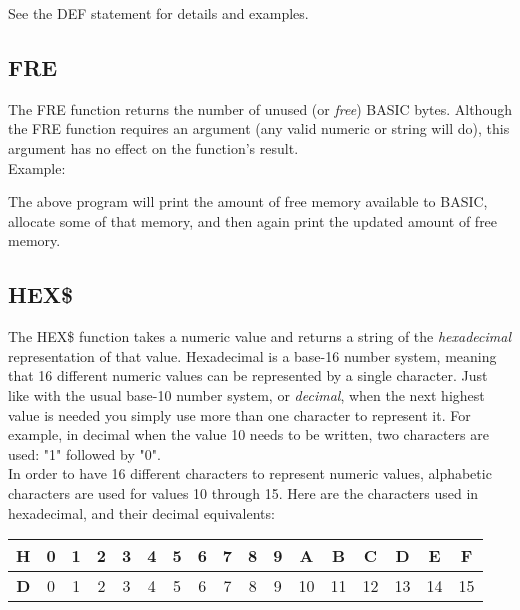 See the {\ttfamily DEF} statement for details and examples.\\

\subsection{FRE}

The {\ttfamily FRE} function returns the number of unused (or {\em free}) BASIC
bytes.  Although the {\ttfamily FRE} function requires an argument (any valid
numeric or string will do), this argument has no effect on the function's
result.\\

Example:\\


The above program will print the amount of free memory available to BASIC,
allocate some of that memory, and then again print the updated amount of free
memory.\\

\subsection{HEX\$}

The {\ttfamily HEX\$} function takes a numeric value and returns a string of
the {\em hexadecimal} representation of that value.  Hexadecimal is a base-16
number system, meaning that 16 different numeric values can be represented by a
single character.  Just like with the usual base-10 number system, or {\em
decimal}, when the next highest value is needed you simply use more than one
character to represent it.  For example, in decimal when the value 10 needs to
be written, two characters are used: "1" followed by "0".\\

In order to have 16 different characters to represent numeric values,
alphabetic characters are used for values 10 through 15.  Here are the
characters used in hexadecimal, and their decimal equivalents:\\

\begin{tabular}{|c|c|c|c|c|c|c|c|c|c|c|c|c|c|c|c|c|}
	\hline
	{\bfseries H} & 0 & 1 & 2 & 3 & 4 & 5 & 6 & 7 & 8 & 9 & A & B & C & D & E & F \\ \hline
	{\bfseries D} & 0 & 1 & 2 & 3 & 4 & 5 & 6 & 7 & 8 & 9 & 10 & 11 & 12 & 13 & 14 & 15 \\ \hline
\end{tabular}

